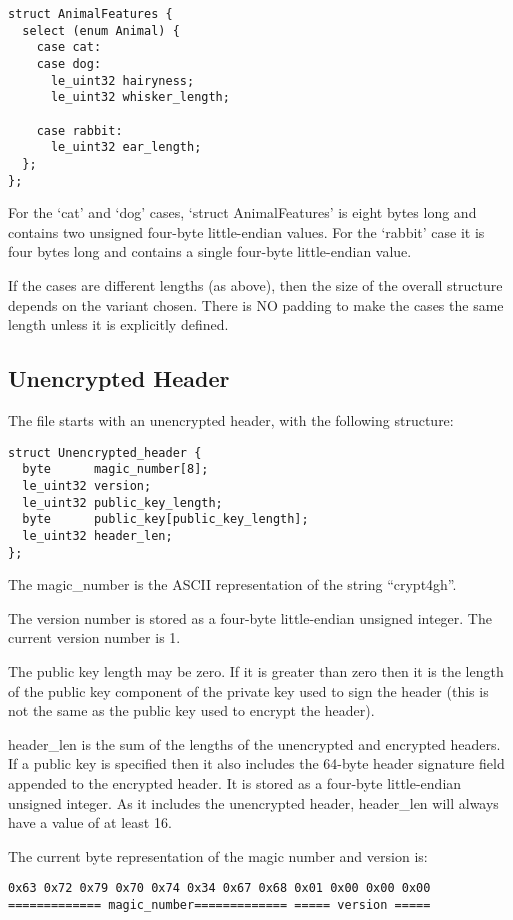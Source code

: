 \documentclass[10pt]{article}
\begin{document}
\begin{verbatim}
struct AnimalFeatures {
  select (enum Animal) {
    case cat:
    case dog:
      le_uint32 hairyness;
      le_uint32 whisker_length;

    case rabbit:
      le_uint32 ear_length;
  };
};
\end{verbatim}

For the `cat' and `dog' cases, `struct AnimalFeatures' is eight bytes long and contains two unsigned four-byte
little-endian values.
For the `rabbit' case it is four bytes long and contains a single four-byte little-endian value.

If the cases are different lengths (as above), then the size of the overall structure depends on the variant chosen.
There is NO padding to make the cases the same length unless it is explicitly defined.

\subsection{Unencrypted Header}

The file starts with an unencrypted header, with the following structure:

\begin{verbatim}
struct Unencrypted_header {
  byte      magic_number[8];
  le_uint32 version;
  le_uint32 public_key_length;
  byte      public_key[public_key_length];
  le_uint32 header_len;
};
\end{verbatim}

The magic\_number is the ASCII representation of the string ``crypt4gh''.

The version number is stored as a four-byte little-endian unsigned integer.
The current version number is 1.

The public key length may be zero.
If it is greater than zero then it is the length of the public key component of the private key used to sign the
header (this is not the same as the public key used to encrypt the header).

header\_len is the sum of the lengths of the unencrypted and encrypted headers.
If a public key is specified then it also includes the 64-byte header signature field appended to the encrypted header.
It is stored as a four-byte little-endian unsigned integer.
As it includes the unencrypted header, header\_len will always have a value of at least 16.

The current byte representation of the magic number and version is:
\begin{verbatim}
0x63 0x72 0x79 0x70 0x74 0x34 0x67 0x68 0x01 0x00 0x00 0x00
============= magic_number============= ===== version =====
\end{verbatim}
\end{document}
